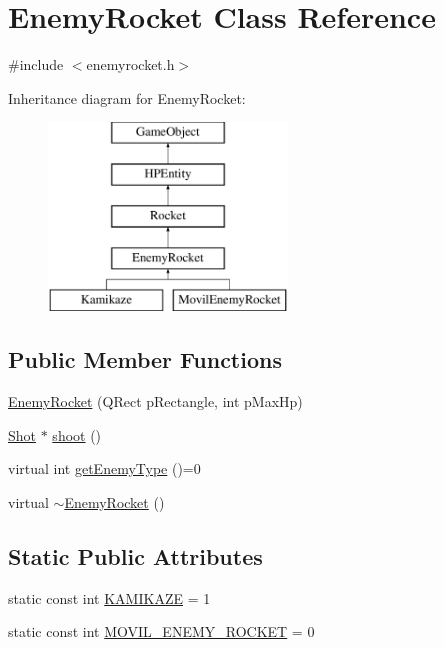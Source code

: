\hypertarget{class_enemy_rocket}{\section{Enemy\-Rocket Class Reference}
\label{class_enemy_rocket}
}


{\ttfamily \#include $<$enemyrocket.\-h$>$}

Inheritance diagram for Enemy\-Rocket\-:\begin{figure}[H]
\begin{center}
\leavevmode
\includegraphics[height=5.000000cm]{class_enemy_rocket}
\end{center}
\end{figure}
\subsection*{Public Member Functions}
\begin{DoxyCompactItemize}
\item 
\hyperlink{class_enemy_rocket_a602b0809840648ca73f620968499df55}{Enemy\-Rocket} (Q\-Rect p\-Rectangle, int p\-Max\-Hp)
\item 
\hyperlink{class_shot}{Shot} $\ast$ \hyperlink{class_enemy_rocket_aaa119ae66d24f37445ee53f0e2184bc2}{shoot} ()
\item 
virtual int \hyperlink{class_enemy_rocket_a44e857f29c0846545743e21638391527}{get\-Enemy\-Type} ()=0
\item 
virtual \hyperlink{class_enemy_rocket_abb973e1ee2e99a06789131b1dd3180ab}{$\sim$\-Enemy\-Rocket} ()
\end{DoxyCompactItemize}
\subsection*{Static Public Attributes}
\begin{DoxyCompactItemize}
\item 
static const int \hyperlink{class_enemy_rocket_a15caca840f5e774985fecf4295d9446d}{K\-A\-M\-I\-K\-A\-Z\-E} = 1
\item 
static const int \hyperlink{class_enemy_rocket_a62103a6d3bc8dd2860b91d5250113281}{M\-O\-V\-I\-L\-\_\-\-E\-N\-E\-M\-Y\-\_\-\-R\-O\-C\-K\-E\-T} = 0
\end{DoxyCompactItemize}

